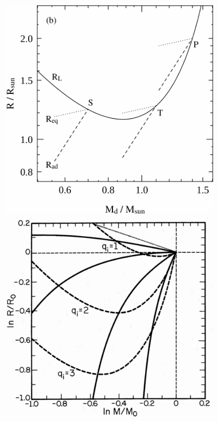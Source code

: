 \documentclass[a4paper,titlepage]{book}     	%
\begin{document}
\begin{figure}
	\begin{minipage}{.49\textwidth}
		\centering
		\includegraphics[width=\textwidth]{./images/stp_roche.pdf}
	\end{minipage}
	\hfill
	\begin{minipage}{.49\textwidth}
	    \vspace{-7mm}
		\centering
		\includegraphics[width=\textwidth]{./images/core_he_rlof.pdf}	

\end{minipage}
\end{figure}
\end{document}
